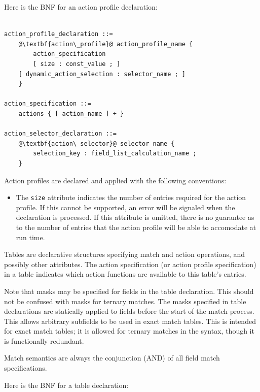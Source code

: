 \documentclass[12pt]{article}
\begin{document}
Here is the BNF for an action profile declaration:

\begin{lstlisting}[frame=single,backgroundcolor=\color{bnfgreen},escapechar=\@]

action_profile_declaration ::=
    @\textbf{action\_profile}@ action_profile_name {
        action_specification
        [ size : const_value ; ]
	[ dynamic_action_selection : selector_name ; ]
    }

action_specification ::= 
    actions { [ action_name ] + }

action_selector_declaration ::=
    @\textbf{action\_selector}@ selector_name {
        selection_key : field_list_calculation_name ;
    }

\end{lstlisting}

Action profiles are declared and applied with the following conventions:

\begin{itemize}
\item
The \texttt{size} attribute indicates the number of entries required for the
action profile. If this cannot be supported, an error will be signaled when the
declaration is processed. If this attribute is omitted, there is no guarantee as
to the number of entries that the action profile will be able to accomodate at
run time.
\end{itemize}



Tables are declarative structures specifying match and action operations, and
possibly other attributes. The action specification (or action profile
specification) in a table indicates which action functions are available to this
table's entries.

Note that masks may be specified for fields in the table declaration. This 
should not be confused with masks for ternary matches. The masks specified 
in table declarations are statically applied to fields before the start of 
the match process. This allows arbitrary subfields to be used in exact match 
tables. This is intended for exact match tables; it is allowed for ternary 
matches in the syntax, though it is functionally redundant.

Match semantics are always the conjunction (AND) of all field match specifications.

Here is the BNF for a table declaration:
\end{document}

